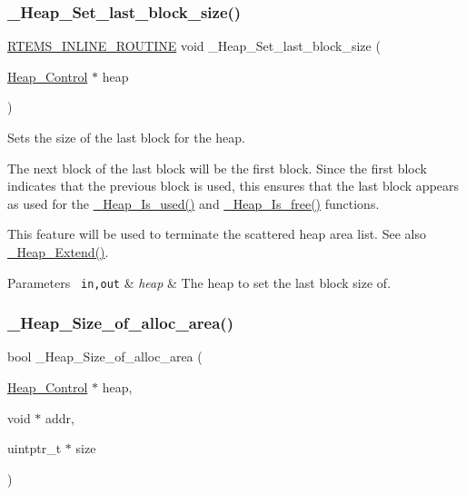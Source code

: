 \subsubsection{\texorpdfstring{\_Heap\_Set\_last\_block\_size()}{\_Heap\_Set\_last\_block\_size()}}
{\footnotesize\ttfamily \mbox{\hyperlink{group__RTEMSScoreBaseDefs_gac216239df231d5dbd15e3520b0b9313f}{R\+T\+E\+M\+S\+\_\+\+I\+N\+L\+I\+N\+E\+\_\+\+R\+O\+U\+T\+I\+NE}} void \+\_\+\+Heap\+\_\+\+Set\+\_\+last\+\_\+block\+\_\+size (\begin{DoxyParamCaption}\item[{\mbox{\hyperlink{structHeap__Control}{Heap\+\_\+\+Control}} $\ast$}]{heap }\end{DoxyParamCaption})}



Sets the size of the last block for the heap. 

The next block of the last block will be the first block. Since the first block indicates that the previous block is used, this ensures that the last block appears as used for the \mbox{\hyperlink{group__RTEMSScoreHeap_ga7108eed881e09dc3519e8a35220f0feb}{\+\_\+\+Heap\+\_\+\+Is\+\_\+used()}} and \mbox{\hyperlink{group__RTEMSScoreHeap_gae9a216779de2fa37926f7cba5d8342dd}{\+\_\+\+Heap\+\_\+\+Is\+\_\+free()}} functions.

This feature will be used to terminate the scattered heap area list. See also \mbox{\hyperlink{group__RTEMSScoreHeap_ga7484f40d81ae26a7f5b3773a2dd006be}{\+\_\+\+Heap\+\_\+\+Extend()}}.


\begin{DoxyParams}[1]{Parameters}
\mbox{\texttt{ in,out}}  & {\em heap} & The heap to set the last block size of. \\
\hline
\end{DoxyParams}
\mbox{\label{group__RTEMSScoreHeap_ga8985839270f72039581fb4ddc44d433a}} 
\subsubsection{\texorpdfstring{\_Heap\_Size\_of\_alloc\_area()}{\_Heap\_Size\_of\_alloc\_area()}}
{\footnotesize\ttfamily bool \+\_\+\+Heap\+\_\+\+Size\+\_\+of\+\_\+alloc\+\_\+area (\begin{DoxyParamCaption}\item[{\mbox{\hyperlink{structHeap__Control}{Heap\+\_\+\+Control}} $\ast$}]{heap,  }\item[{void $\ast$}]{addr,  }\item[{uintptr\+\_\+t $\ast$}]{size }\end{DoxyParamCaption})}



